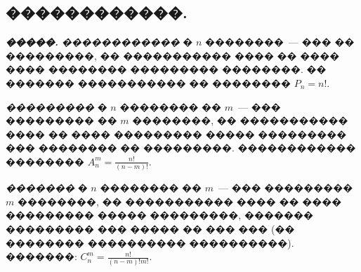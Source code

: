 \documentclass[a4paper,12pt]{article}
\begin{document}
\newpage

\begin{center}
\section*{������������.}
\end{center}

\textit{\textbf{�����.}} \textit{������������} � $n$ ��������~--- ��� �� ���������, �� ����������� ���� �� ���� ���� �������� ��������� ��������. �� ������� ����������� �� �������� $P_{n}=n!$.

\textit{���������} � $n$ �������� �� $m$~--- ��� ��������� �� $m$ ��������, �� ����������� ���� �� ���� ��������� ����� ��������� ��� �������� �� ���������. ������������ �������� $A_{n}^{m}=\frac{n!}{(n-m)!}$.

\textit{�������} � $n$ �������� �� $m$~--- ��� ��������� $m$ ��������, �� ����������� ���� �� ���� ��������� ����� ���������, ������� ��������� ��� ����� �� ��� ��� (�� �������� ���������� ����������). �������: $C_{n}^{m}=\frac{n!}{(n-m)!m!}$.

\medskip\medskip\medskip
\end{document}
